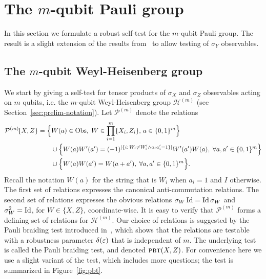 \section{The \texorpdfstring{$m$}{m}-qubit Pauli group}
\label{sec:pauli-group}

In this section we formulate a robust self-test for the $m$-qubit Pauli group. The result is a slight extension of the results from~\cite{natarajan2016robust} to allow testing of $\sigma_Y$ observables. 

\subsection{The \texorpdfstring{$m$}{m}-qubit Weyl-Heisenberg group}
\label{sec:pbt}

We start by giving a self-test for tensor products of $\sigma_X$ and $\sigma_Z$ 
observables acting on $m$ qubits, i.e. the $m$-qubit Weyl-Heisenberg group $\mathcal{H}^{(m)}$ (see Section~\ref{sec:prelim-notation}). 
Let $\mathcal{P}^{(m)}$ denote the relations  
\begin{align*}
\mathcal{P}^{(m)}\!\{X,Z\} &= \Big\{ W(a)\in\mathrm{Obs},\;W \in \prod_{i=1}^m \{X_i,Z_i\},\,a\in\{0,1\}^m\Big\}\\
&\qquad\cup \Big\{W(a)W'(a')=(-1)^{|\{i:\,W_i\neq W'_i \wedge a_ia'_i=1\}|} W'(a')W(a),\;\forall a,a'\in\{0,1\}^m\Big\}\\
&\qquad \cup\Big\{ W(a)W(a')=W(a+a'),\;\forall a,a'\in\{0,1\}^m\Big\}.
\end{align*}
Recall the notation $W(a)$ for the string that is $W_i$ when $a_i=1$ and $I$ otherwise. 
The first set of relations expresses the canonical anti-commutation relations. The second set of relations expresses the obvious relations $\sigma_W \mathop{\rm Id}\nolimits = \mathop{\rm Id}\nolimits \sigma_W$ and $\sigma_W^2 = \mathop{\rm Id}\nolimits$, for $W\in\{X,Z\}$, coordinate-wise. It is easy to verify that $\mathcal{P}^{(m)}$ forms a defining set of relations for $\mathcal{H}^{(m)}$. Our choice of relations is suggested by the Pauli braiding test introduced in~\cite{natarajan2016robust}, which shows that the relations are testable with a robustness parameter $\delta(\varepsilon)$ that is independent of $m$. 
The underlying test is called the Pauli braiding test, and denoted $\textsc{pbt}(X,Z)$. For convenience here we use a slight variant of the test, which includes more questions; the test is summarized in Figure~\ref{fig:pbt}. 

